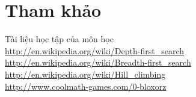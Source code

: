 \documentclass[11pt,a4paper]{article}
\begin{document}
\section{Tham khảo}
\begin{flushleft}
	\hspace{2 cm} \textbullet \hspace{0.5 cm} Tài liệu học tập của môn học \\
	\hspace{2 cm} \textbullet \hspace{0.5 cm} \url{http://en.wikipedia.org/wiki/Depth-first\_search} \\
	\hspace{2 cm} \textbullet \hspace{0.5 cm} \url{http://en.wikipedia.org/wiki/Breadth-first\_search} \\
	\hspace{2 cm} \textbullet \hspace{0.5 cm} \url{http://en.wikipedia.org/wiki/Hill\_climbing} \\
	\hspace{2 cm} \textbullet \hspace{0.5 cm} \url{http://www.coolmath-games.com/0-bloxorz} \\
\end{flushleft}
\end{document}
